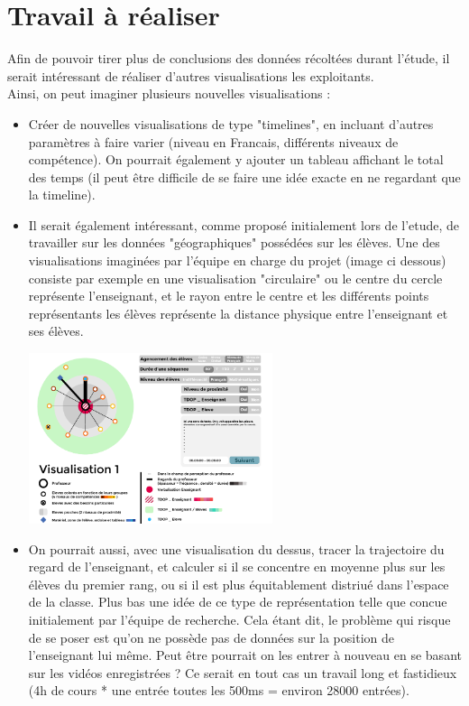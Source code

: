 \documentclass{article}
\begin{document}
\section{Travail à réaliser}
Afin de pouvoir tirer plus de conclusions des données récoltées durant l'étude, il serait intéressant de réaliser d'autres visualisations les exploitants.\\
Ainsi, on peut imaginer plusieurs nouvelles visualisations :
\begin{itemize}
  \item Créer de nouvelles visualisations de type "timelines", en incluant d'autres paramètres à faire varier (niveau en Francais, différents niveaux de compétence). On pourrait également y ajouter un tableau affichant le total des temps (il peut être difficile de se faire une idée exacte en ne regardant que la timeline).
  \item Il serait également intéressant, comme proposé initialement lors de l'etude, de travailler sur les données "géographiques" possédées sur les élèves. Une des visualisations imaginées par l'équipe en charge du projet (image ci dessous) consiste par exemple en une visualisation "circulaire" ou le centre du cercle représente l'enseignant, et le rayon entre le centre et les différents points représentants les élèves représente la distance physique entre l'enseignant et ses élèves.\\
    \begin{center}
      \includegraphics[height=5cm]{visu_cercle.png}
    \end{center}
  \item On pourrait aussi, avec une visualisation du dessus, tracer la trajectoire du regard de l'enseignant, et calculer si il se concentre en moyenne plus sur les élèves du premier rang, ou si il est plus équitablement distriué dans l'espace de la classe. Plus bas une idée de ce type de représentation telle que concue initialement par l'équipe de recherche. Cela étant dit, le problème qui risque de se poser est qu'on ne possède pas de données sur la position de l'enseignant lui même. Peut être pourrait on les entrer à nouveau en se basant sur les vidéos enregistrées ? Ce serait en tout cas un travail long et fastidieux (4h de cours * une entrée toutes les 500ms = environ 28000 entrées).\\

\end{itemize}
\end{document}
